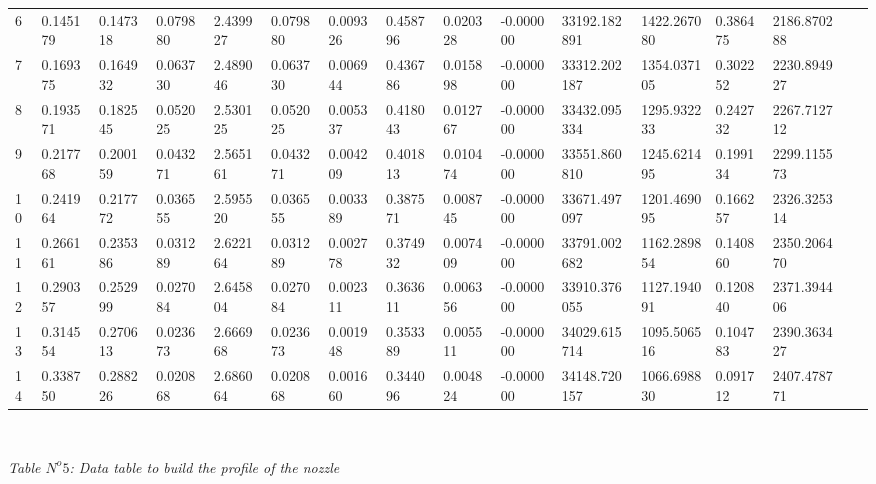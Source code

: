\begin{center}
\begin{tabular}{|l*{15}{l|}}
6 & 0.145179 & 0.147318 & 0.079880 & 2.439927 & 0.079880 & 0.009326 & 0.458796 & 0.020328 & -0.000000 & 33192.182891 & 1422.267080 & 0.386475 & 2186.870288 \\
7 & 0.169375 & 0.164932 & 0.063730 & 2.489046 & 0.063730 & 0.006944 & 0.436786 & 0.015898 & -0.000000 & 33312.202187 & 1354.037105 & 0.302252 & 2230.894927 \\
8 & 0.193571 & 0.182545 & 0.052025 & 2.530125 & 0.052025 & 0.005337 & 0.418043 & 0.012767 & -0.000000 & 33432.095334 & 1295.932233 & 0.242732 & 2267.712712 \\
9 & 0.217768 & 0.200159 & 0.043271 & 2.565161 & 0.043271 & 0.004209 & 0.401813 & 0.010474 & -0.000000 & 33551.860810 & 1245.621495 & 0.199134 & 2299.115573 \\
10 & 0.241964 & 0.217772 & 0.036555 & 2.595520 & 0.036555 & 0.003389 & 0.387571 & 0.008745 & -0.000000 & 33671.497097 & 1201.469095 & 0.166257 & 2326.325314 \\
11 & 0.266161 & 0.235386 & 0.031289 & 2.622164 & 0.031289 & 0.002778 & 0.374932 & 0.007409 & -0.000000 & 33791.002682 & 1162.289854 & 0.140860 & 2350.206470 \\
12 & 0.290357 & 0.252999 & 0.027084 & 2.645804 & 0.027084 & 0.002311 & 0.363611 & 0.006356 & -0.000000 & 33910.376055 & 1127.194091 & 0.120840 & 2371.394406 \\
13 & 0.314554 & 0.270613 & 0.023673 & 2.666968 & 0.023673 & 0.001948 & 0.353389 & 0.005511 & -0.000000 & 34029.615714 & 1095.506516 & 0.104783 & 2390.363427 \\
14 & 0.338750 & 0.288226 & 0.020868 & 2.686064 & 0.020868 & 0.001660 & 0.344096 & 0.004824 & -0.000000 & 34148.720157 & 1066.698830 & 0.091712 & 2407.478771 \\
\hline
\end{tabular}\\
\end{center}
\begin{flushright}
\textit{Table $N^o 5$: Data table to build the profile of the nozzle}\\
\end{flushright}
